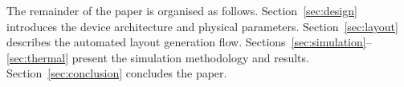 The remainder of the paper is organised as follows.
Section~\ref{sec:design} introduces the device architecture and
physical parameters.  Section~\ref{sec:layout} describes the automated
layout generation flow.  Sections~\ref{sec:simulation}--\ref{sec:thermal}
present the simulation methodology and results.
Section~\ref{sec:conclusion} concludes the paper.
